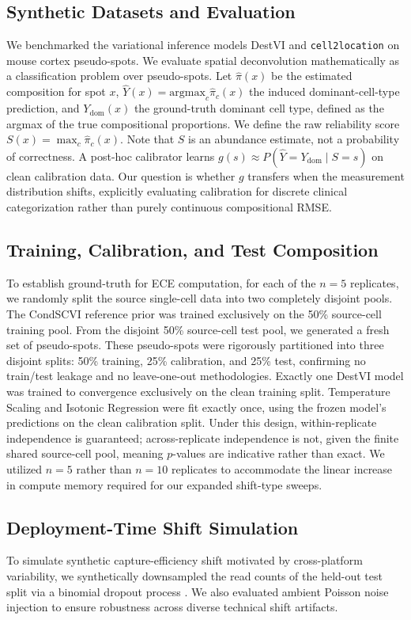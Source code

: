 \documentclass{jmlr} %
\begin{document}
\subsection{Synthetic Datasets and Evaluation}
We benchmarked the variational inference models DestVI and \texttt{cell2location} on mouse cortex pseudo-spots. We evaluate spatial deconvolution mathematically as a classification problem over pseudo-spots. Let $\hat{\pi}(x)$ be the estimated composition for spot $x$, $\hat{Y}(x) = \text{argmax}_c \hat{\pi}_c(x)$ the induced dominant-cell-type prediction, and $Y_{\text{dom}}(x)$ the ground-truth dominant cell type, defined as the argmax of the true compositional proportions. We define the raw reliability score $S(x) = \max_c \hat{\pi}_c(x)$. Note that $S$ is an abundance estimate, not a probability of correctness. A post-hoc calibrator learns $g(s) \approx P(\hat{Y} = Y_{\text{dom}} \mid S = s)$ on clean calibration data. Our question is whether $g$ transfers when the measurement distribution shifts, explicitly evaluating calibration for discrete clinical categorization rather than purely continuous compositional RMSE.

\subsection{Training, Calibration, and Test Composition}
To establish ground-truth for ECE computation, for each of the $n=5$ replicates, we randomly split the source single-cell data into two completely disjoint pools. The CondSCVI reference prior was trained exclusively on the 50\% source-cell training pool. From the disjoint 50\% source-cell test pool, we generated a fresh set of pseudo-spots. These pseudo-spots were rigorously partitioned into three disjoint splits: 50\% training, 25\% calibration, and 25\% test, confirming no train/test leakage and no leave-one-out methodologies. Exactly one DestVI model was trained to convergence exclusively on the clean training split. Temperature Scaling and Isotonic Regression were fit exactly once, using the frozen model's predictions on the clean calibration split. Under this design, within-replicate independence is guaranteed; across-replicate independence is not, given the finite shared source-cell pool, meaning $p$-values are indicative rather than exact. We utilized $n=5$ rather than $n=10$ replicates to accommodate the linear increase in compute memory required for our expanded shift-type sweeps.

\subsection{Deployment-Time Shift Simulation}
To simulate synthetic capture-efficiency shift motivated by cross-platform variability, we synthetically downsampled the read counts of the held-out test split via a binomial dropout process \citep{townes2019feature}. We also evaluated ambient Poisson noise injection to ensure robustness across diverse technical shift artifacts.
\end{document}
